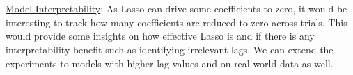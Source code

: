 \documentclass[12pt, oneside]{amsart}
\theoremstyle{definition}
\theoremstyle{remark}
\numberwithin{equation}{section}
\begin{document}
\\
\\
\underline{Model Interpretability}:
As Lasso can drive some coefficients to zero, it would be interesting to track how many coefficients are reduced to zero across trials. This would provide some insights on how effective Lasso is and if there is any interpretability benefit such as identifying irrelevant lags. We can extend the experiments to models with higher lag values and on real-world data as well. 

\clearpage
\printbibliography
\end{document}
